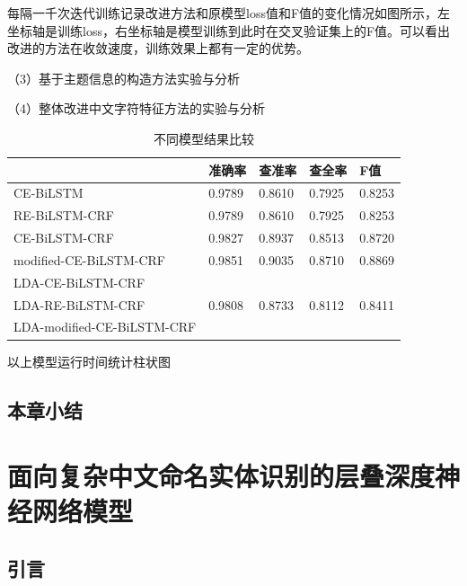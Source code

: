 \documentclass[winfonts,master,oneside,nobackinfo]{njuthesis}
\begin{document}
每隔一千次迭代训练记录改进方法和原模型loss值和F值的变化情况如图所示，左坐标轴是训练loss，右坐标轴是模型训练到此时在交叉验证集上的F值。可以看出改进的方法在收敛速度，训练效果上都有一定的优势。

（3）基于主题信息的构造方法实验与分析




（4）整体改进中文字符特征方法的实验与分析

\begin{table}[H]
\centering
\begin{tabular}{|l|l|l|l|l|}
\hline
\hline
                           & 准确率 & 查准率 & 查全率& F值 \\ \hline
CE-BiLSTM             &     0.9789          &   0.8610             &  0.7925      &   0.8253    \\ \hline
RE-BiLSTM-CRF              &     0.9789          &   0.8610             &  0.7925      &   0.8253    \\ \hline
CE-BiLSTM-CRF              &     0.9827          &   0.8937           &    0.8513         & 0.8720   \\ \hline
modified-CE-BiLSTM-CRF     &     0.9851         &    0.9035            &   0.8710         & 0.8869  \\ \hline
LDA-CE-BiLSTM-CRF          &               &                &             &    \\ \hline
LDA-RE-BiLSTM-CRF          &     0.9808         &   0.8733             &  0.8112           & 0.8411   \\ \hline
LDA-modified-CE-BiLSTM-CRF &               &                &             &    \\ \hline
\hline
\end{tabular}
\caption{不同模型结果比较}
\end{table}

以上模型运行时间统计柱状图


\section{本章小结}





\chapter{面向复杂中文命名实体识别的层叠深度神经网络模型}

\section{引言}
\end{document}
